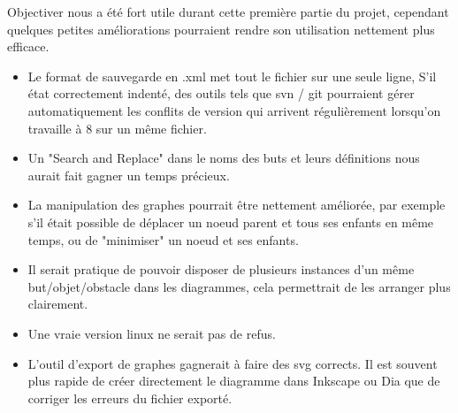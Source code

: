 Objectiver nous a été fort utile durant cette première partie du projet,
cependant quelques petites améliorations pourraient rendre son utilisation
nettement plus efficace.

\begin{itemize}
	\item Le format de sauvegarde en .xml met tout le fichier sur une seule
	ligne, S'il état correctement indenté, des outils tels que svn / git
	pourraient gérer automatiquement les conflits de version qui arrivent
	régulièrement lorsqu'on travaille à 8 sur un même fichier.
	
	\item Un "Search and Replace" dans le noms des buts et leurs définitions
	nous aurait fait gagner un temps précieux. 

	\item La manipulation des graphes pourrait être nettement améliorée,
	par exemple s'il était possible de déplacer un noeud parent et tous ses
	enfants en même temps, ou de "minimiser" un noeud et ses enfants. 

	\item Il serait pratique de pouvoir disposer de plusieurs instances d'un
	même but/objet/obstacle dans les diagrammes, cela permettrait de les 
	arranger plus clairement.

	\item Une vraie version linux ne serait pas de refus.

	\item L'outil d'export de graphes gagnerait à faire des svg corrects. Il
	est souvent plus rapide de créer directement le diagramme dans Inkscape ou
	Dia que de corriger les erreurs du fichier exporté. 

\end{itemize}



